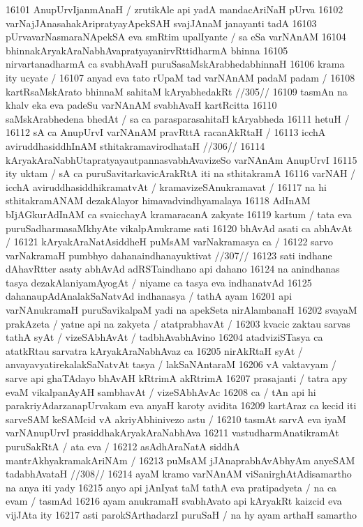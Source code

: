 16101 AnupUrvIjanmAnaH / zrutikAle api yadA mandacAriNaH pUrva
16102 varNajJAnasahakAripratyayApekSAH svajJAnaM janayanti tadA
16103 pUrvavarNasmaraNApekSA eva smRtim upalIyante / sa eSa varNAnAM
16104 bhinnakAryakAraNabhAvapratyayanirvRttidharmA bhinna  
16105 nirvartanadharmA ca svabhAvaH puruSasaMskArabhedabhinnaH  
16106 krama ity ucyate /  
16107 	anyad eva tato rUpaM tad varNAnAM padaM padam / 
16108 	kartRsaMskArato bhinnaM sahitaM kAryabhedakRt //305//  
16109 tasmAn na khalv eka eva padeSu varNAnAM svabhAvaH kartRcitta  
16110 saMskArabhedena bhedAt / sa ca parasparasahitaH kAryabheda
16111 hetuH / 
16112 	sA ca AnupUrvI varNAnAM pravRttA racanAkRtaH / 
16113 	icchA aviruddhasiddhInAM sthitakramavirodhataH //306//
16114 kAryakAraNabhUtapratyayautpannasvabhAvavizeSo varNAnAm AnupUrvI
16115 ity uktam / sA ca puruSavitarkavicArakRtA iti na sthitakramA
16116 varNAH / icchA aviruddhasiddhikramatvAt / kramavizeSAnukramavat /
16117 na hi sthitakramANAM dezakAlayor himavadvindhyamalaya 
16118 AdInAM bIjAGkurAdInAM ca svaicchayA kramaracanA zakyate 
16119 kartum / tata eva puruSadharmasaMkhyAte vikalpAnukrame sati 
16120 bhAvAd asati ca abhAvAt /
16121 	kAryakAraNatAsiddheH puMsAM varNakramasya ca /  
16122 	sarvo varNakramaH pumbhyo dahanaindhanayuktivat //307// 
16123 sati indhane dAhavRtter asaty abhAvAd adRSTaindhano api dahano 
16124 na anindhanas tasya dezakAlaniyamAyogAt / niyame ca tasya  eva indhanatvAd
16125 dahanaupAdAnalakSaNatvAd indhanasya / tathA ayam  
16201 api varNAnukramaH puruSavikalpaM yadi na apekSeta nirAlambanaH  
16202 svayaM prakAzeta / yatne api na zakyeta / atatprabhavAt /  
16203 kvacic zaktau sarvas tathA syAt / vizeSAbhAvAt / tadbhAvabhAvino
16204 atadviziSTasya ca atatkRtau sarvatra kAryakAraNabhAvaz ca
16205 nirAkRtaH syAt / anvayavyatirekalakSaNatvAt tasya /  lakSaNAntaraM 
16206 vA vaktavyam / sarve api ghaTAdayo bhAvAH kRtrimA akRtrimA  
16207 prasajanti / tatra apy evaM vikalpanAyAH sambhavAt / vizeSAbhAvAc  
16208 ca / tAn api hi parakriyAdarzanapUrvakam eva anyaH karoty avidita
16209 kartAraz ca kecid iti sarveSAM keSAMcid vA akriyAbhinivezo astu /  
16210 tasmAt sarvA eva iyaM varNAnupUrvI prasiddhakAryakAraNabhAva  
16211 vastudharmAnatikramAt puruSakRtA / ata eva /
16212 	asAdhAraNatA siddhA mantrAkhyakramakAriNAm /  
16213 	puMsAM jJAnaprabhAvAbhyAm anyeSAM tadabhAvataH //308//
16214 ayaM kramo varNAnAM viSanirghAtAdisamartho na anya iti yady 
16215 anyo api jAnIyat taM tathA eva pratipadyeta / na ca evam / tasmAd  
16216 ayam anukramaH svabhAvato api kAryakRt kaizcid eva vijJAta ity  
16217 asti parokSArthadarzI puruSaH / na hy ayam arthaH samartho
